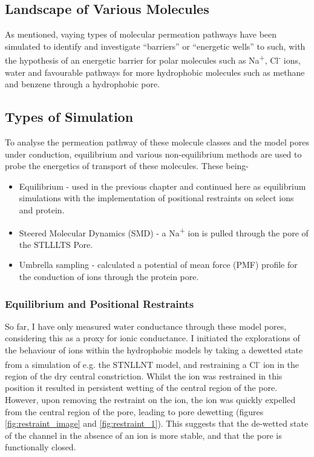 \subsection{Landscape of Various Molecules}

As mentioned, vaying types of molecular permeation pathways have been simulated to identify and investigate ``barriers'' or ``energetic wells'' to such, with the hypothesis of an energetic barrier for polar molecules such as Na\textsuperscript{+}, Cl\textsuperscript{-} ions, water and favourable pathways for more hydrophobic molecules such as methane and benzene through a hydrophobic pore.

\subsection{Types of Simulation}

To analyse the permeation pathway of these molecule classes and the model pores under conduction, equilibrium and various non-equilibrium methods are used to probe the energetics of transport of these molecules. These being-

\begin{itemize}
\item Equilibrium - used in the previous chapter and continued here as equilibrium simulations with the implementation of positional restraints on select ions and protein. 
\item Steered Molecular Dynamics (SMD) - a Na\textsuperscript{+} ion is pulled through the pore of the STLLLTS Pore.
\item Umbrella sampling - calculated a potential of mean force (PMF) profile for the conduction of ions through the protein pore. 
\end{itemize}

\subsubsection{Equilibrium and Positional Restraints}

So far, I have only measured water conductance through these model pores, considering this as a proxy for ionic conductance. I initiated the explorations of the behaviour of ions within the hydrophobic models by taking a dewetted state from a simulation of e.g. the STNLLNT model, and restraining a Cl\textsuperscript{-} ion in the region of the dry central constriction. Whilst the ion was restrained in this position it resulted in persistent wetting of the central region of the pore. However, upon removing the restraint on the ion, the ion was quickly expelled from the central region of the pore, leading to pore dewetting (figures \ref{fig:restraint_image} and \ref{fig:restraint_1}). This suggests that the de-wetted state of the channel in the absence of an ion is more stable, and that the pore is functionally closed. 

